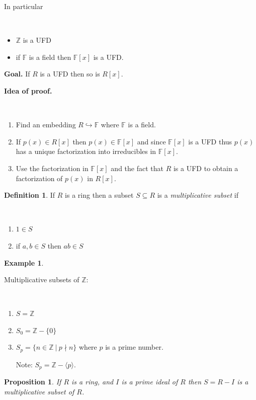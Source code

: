 \documentclass[12pt, letterpaper, oneside]{article}
\theoremstyle{plain}
\newtheorem{proposition}[theorem]{Proposition}
\theoremstyle{definition}
\newtheorem{definition}[theorem]{Definition}
\newtheorem{example}[theorem]{Example}
\newcommand{\hra}{\hookrightarrow}
\newcommand{\Z}{{\mathbb Z}}
\newcommand{\F}{{\mathbb F}}
\newcommand{\subgp}[1]{\langle#1\rangle}
\newcommand{\benu}{\begin{enumerate}}
\newcommand{\eenu}{\end{enumerate}}
\newcommand{\bit}{\begin{itemize}}
\newcommand{\eit}{\end{itemize}}
\newcommand{\vs}{\vskip 5mm}
\newcommand{\isep}[1][0]{\setlength{\itemsep}{#1 mm}}
\begin{document}
In particular 

\vskip -13mm

\ 
\bit
\item $\Z$ is a UFD
\item if $\F$ is a field then $\F[x]$ is a UFD.
\eit

\vs

\textbf{Goal.} If $R$ is a UFD then so is $R[x]$.


\vs

\textbf{Idea of proof.} 

\vskip -13mm

\ 
\benu
\item Find an embedding $R \hra \F$ where $\F$ is a field.
\item If $p(x)\in R[x]$ then $p(x)\in \F[x]$ and since $\F[x]$ is a UFD thus $p(x)$ has a 
unique factorization into irreducibles in $\F[x]$.
\item Use the factorization in $\F[x]$ and the fact that $R$ is a UFD to obtain a factorization 
of $p(x)$ in $R[x]$. 
\eenu
 
 
\vs\vs\vs


\begin{definition}
If $R$ is a ring then a subset $S\subseteq R$ is a \emph{multiplicative subset} if 


\vskip -13mm

\ 
\benu
\isep[0]
\item $1\in S$
\item  if $a, b\in S$ then $ab\in S$
\eenu 
\end{definition} 
 
 
 \vs\vs
 
 
 \begin{example}\ 
 
 Multiplicative subsets of $\Z$:
 
 \vskip -13mm
 
 \ 
 \benu
 \isep[5]
 \item $S = \Z$
 \item $S_{0} = \Z - \{0\}$
 \item $S_{p} = \{n\in \Z \ | \ p\nmid n\}$ where $p$ is a prime number. \newline
 
 \vskip -4mm
 
Note: $S_{p} = \Z - \subgp{p}$.

 \eenu
  \end{example}
 
 \vs\vs
 
 
 \begin{proposition}
 If $R$ is a ring, and $I$ is a prime ideal of $R$ then $S = R-I$ is a multiplicative subset 
 of $R$. 
 \end{proposition}
 
\end{document}
